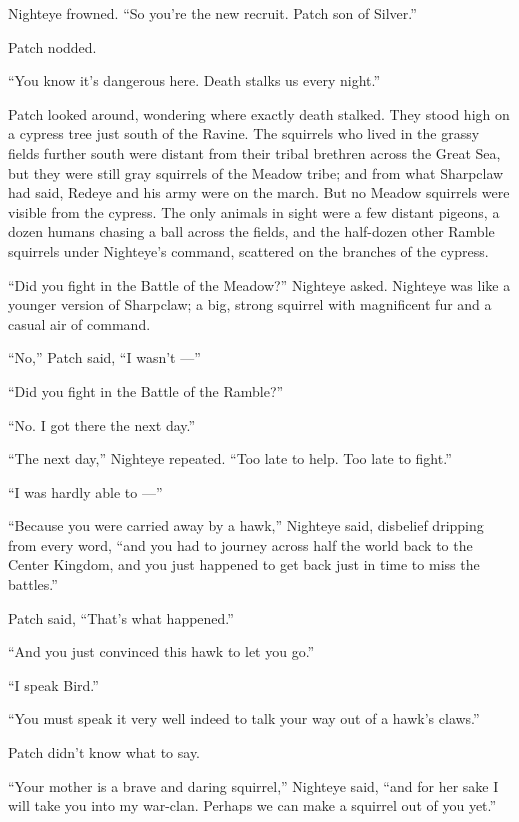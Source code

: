 \documentclass[ebook,oneside,openany,17pt]{memoir}
\newenvironment{tolerant}[1]{%
  \par\tolerance=#1\relax
}{%
  \par
}
\begin{document}
Nighteye frowned. “So you’re the new recruit. Patch son of Silver.”

Patch nodded.

“You know it’s dangerous here. Death stalks us every night.”

Patch looked around, wondering where exactly death stalked. They stood
high on a cypress tree just south of the Ravine. The squirrels who
lived in the grassy fields further south were distant from their
tribal brethren across the Great Sea, but they were still gray
squirrels of the Meadow tribe; and from what Sharpclaw had said,
Redeye and his army were on the march. But no Meadow squirrels were
visible from the cypress. The only animals in sight were a few distant
pigeons, a dozen humans chasing a ball across the fields, and the
half-dozen other Ramble squirrels under Nighteye’s command, scattered
on the branches of the cypress.

\begin{tolerant}{1000}
“Did you fight in the Battle of the Meadow?” Nighteye asked. Nighteye
was like a younger version of Sharpclaw; a big, strong squirrel with
magnificent fur and a casual air of command.
\end{tolerant}

“No,” Patch said, “I wasn’t —”

“Did you fight in the Battle of the Ramble?”

“No. I got there the next day.”

“The next day,” Nighteye repeated. “Too late to help. Too late to
fight.”

“I was hardly able to —”

\begin{tolerant}{1000}
“Because you were carried away by a hawk,” Nighteye said, disbelief
dripping from every word, “and you had to journey across half the
world back to the Center Kingdom, and you just happened to get back
just in time to miss the battles.”
\end{tolerant}

Patch said, “That’s what happened.”

“And you just convinced this hawk to let you go.”

“I speak Bird.”

“You must speak it very well indeed to talk your way out of a hawk’s
claws.”

Patch didn’t know what to say.

\begin{tolerant}{1000}
“Your mother is a brave and daring squirrel,” Nighteye said, “and for
her sake I will take you into my war-clan. Perhaps we can make a
squirrel out of you yet.”
\end{tolerant}
\end{document}
